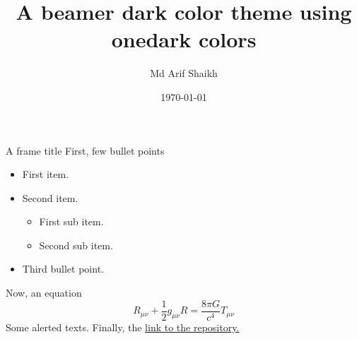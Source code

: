 \documentclass{beamer}
\title{A beamer dark color theme using onedark colors}
\author{Md Arif Shaikh}
\institute{{\color{onecyan}International Centre for Theoretical Sciences, Bangalore, India}}
\date{\today}
\begin{document}
\thispagestyle{empty}
\maketitle

\begin{frame}
  {A frame title}
  First, few bullet points
  \begin{itemize}
  \item First item.
  \item Second item.
    \begin{itemize}
    \item First sub item.
    \item Second sub item.
    \end{itemize}
  \item Third bullet point.
  \end{itemize}
  Now, an equation
  \begin{equation}
    \label{eq:equation}
    R_{\mu\nu} + \frac{1}{2} g_{\mu\nu} R = \frac{8\pi G}{c^4} T_{\mu \nu}
  \end{equation}
  \alert{Some alerted texts}. Finally, the \href{https://github.com/md-arif-shaikh/beamer-one-dark}{link to the repository.}
\end{frame}
\end{document}
